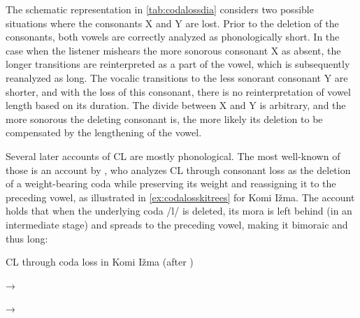 \documentclass[output=paper,
modfonts
]{LSP/langsci}
\begin{document}
The schematic representation in \cref{tab:codalossdia} considers two possible situations
where the consonants X and Y are lost. Prior to the deletion of the
consonants, both vowels are correctly analyzed as phonologically short.
In the case when the listener mishears the more sonorous consonant X as
absent, the longer transitions are reinterpreted as a part of the vowel,
which is subsequently reanalyzed as long. The vocalic transitions to the
less sonorant consonant Y are shorter, and with the loss of this
consonant, there is no reinterpretation of vowel length based on its
duration. The divide between X and Y is arbitrary, and the more sonorous
the deleting consonant is, the more likely its deletion to be
compensated by the lengthening of the vowel.

Several later accounts of CL are mostly phonological. The most
well-known of those is an account by \citet{hayes1989k}, who analyzes CL
through consonant loss as the deletion of a weight-bearing coda while
preserving its weight and reassigning it to the preceding vowel, as
illustrated in \cref{ex:codalosskitrees} for Komi Ižma. The account holds that when the
underlying coda /l/ is deleted, its mora is left behind (in an
intermediate stage) and spreads to the preceding vowel, making it
bimoraic and thus long:

\ea\label{ex:codalosskitrees}CL through coda loss in Komi Ižma (after \citealt{hayes1989k})\\
 →
 →
\z 
\end{document}
